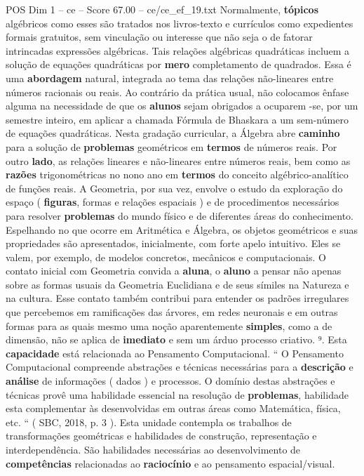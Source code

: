 \begin{textsample}{POS Dim 1 – ce – Score 67.00 – ce/ce\_ef\_19.txt}
Normalmente, \textbf{tópicos} algébricos como esses são tratados nos livros-texto e currículos como expedientes formais gratuitos, sem vinculação ou interesse que não seja o de fatorar intrincadas expressões algébricas.
Tais relações algébricas quadráticas incluem a solução de equações quadráticas por \textbf{mero} completamento de quadrados.
Essa é uma \textbf{abordagem} natural, integrada ao tema das relações não-lineares entre números racionais ou reais.
Ao contrário da prática usual, não colocamos ênfase alguma na necessidade de que os \textbf{alunos} sejam obrigados a ocuparem -se, por um semestre inteiro, em aplicar a chamada Fórmula de Bhaskara a um sem-número de equações quadráticas.
Nesta gradação curricular, a Álgebra abre \textbf{caminho} para a solução de \textbf{problemas} geométricos em \textbf{termos} de números reais.
Por outro \textbf{lado}, as relações lineares e não-lineares entre números reais, bem como as \textbf{razões} trigonométricas no nono ano em \textbf{termos} do conceito algébrico-analítico de funções reais.
A Geometria, por sua vez, envolve o estudo da exploração do espaço ( \textbf{figuras}, formas e relações espaciais ) e de procedimentos necessários para resolver \textbf{problemas} do mundo físico e de diferentes áreas do conhecimento.
Espelhando no que ocorre em Aritmética e Álgebra, os objetos geométricos e suas propriedades são apresentados, inicialmente, com forte apelo intuitivo.
Eles se valem, por exemplo, de modelos concretos, mecânicos e computacionais.
O contato inicial com Geometria convida a \textbf{aluna}, o \textbf{aluno} a pensar não apenas sobre as formas usuais da Geometria Euclidiana e de seus símiles na Natureza e na cultura.
Esse contato também contribui para entender os padrões irregulares que percebemos em ramificações das árvores, em redes neuronais e em outras formas para as quais mesmo uma noção aparentemente \textbf{simples}, como a de dimensão, não se aplica de \textbf{imediato} e sem um árduo processo criativo. ⁹.
Esta \textbf{capacidade} está relacionada ao Pensamento Computacional. “ O Pensamento Computacional compreende abstrações e técnicas necessárias para a \textbf{descrição} e \textbf{análise} de informações ( dados ) e processos.
O domínio destas abstrações e técnicas provê uma habilidade essencial na resolução de \textbf{problemas}, habilidade esta complementar às desenvolvidas em outras áreas como Matemática, física, etc. “ ( SBC, 2018, p. 3 ).
Esta unidade contempla os trabalhos de transformações geométricas e habilidades de construção, representação e interdependência.
São habilidades necessárias ao desenvolvimento de \textbf{competências} relacionadas ao \textbf{raciocínio} e ao pensamento espacial/visual.

\end{textsample}
